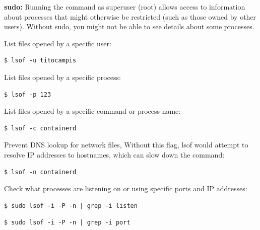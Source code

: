 \documentclass{article}
\newenvironment{blocktemplateIII}[1]{%
    \tcolorbox[beamer,%
    noparskip,breakable,
    ,colframe=Red,%
    colbacklower=LimeGreen!75!LightGreen,%
    title=#1]}%
    {\endtcolorbox}
\newenvironment{codetemplate}[1][]{%
  \mybasecolorbox[#1]
  \itshape
}{%
  \endmybasecolorbox
}
\begin{document}
\begin{blocktemplateIII}{WARNING}
\textbf{sudo:} Running the command as superuser (root) allows access to information about processes that might otherwise be restricted (such as those owned by other users). Without sudo, you might not be able to see details about some processes.
\end{blocktemplateIII}

List files opened by a specific user:
\begin{codetemplate}{}
\begin{verbatim}
$ lsof -u titocampis
\end{verbatim}
\end{codetemplate}

List files opened by a specific process:
\begin{codetemplate}{}
\begin{verbatim}
$ lsof -p 123
\end{verbatim}
\end{codetemplate}

List files opened by a specific command or process name:
\begin{codetemplate}{}
\begin{verbatim}
$ lsof -c containerd
\end{verbatim}
\end{codetemplate}

Prevent DNS lookup for network files, Without this flag, lsof would attempt to resolve IP addresses to hostnames, which can slow down the command:
\begin{codetemplate}{}
\begin{verbatim}
$ lsof -n containerd
\end{verbatim}
\end{codetemplate}

Check what processes are listening on or using specific ports and IP addresses:
\begin{codetemplate}{}
\begin{verbatim}
$ sudo lsof -i -P -n | grep -i listen
\end{verbatim}
\end{codetemplate}

\begin{codetemplate}{}
\begin{verbatim}
$ sudo lsof -i -P -n | grep -i port
\end{verbatim}
\end{codetemplate}
\end{document}
